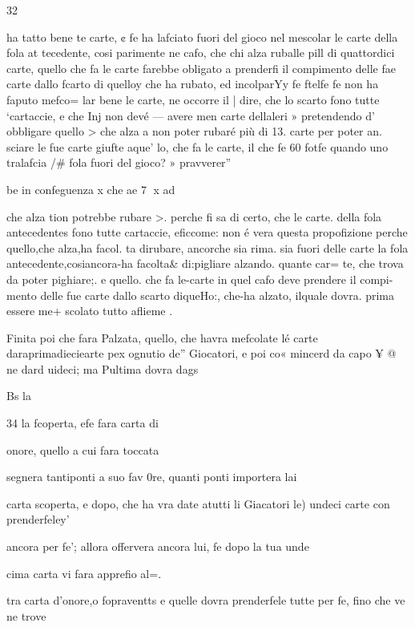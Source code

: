\documentclass[12pt,a6paper]{article}
\begin{document}
 

 

 

 

32

ha tatto bene te carte, ¢ fe ha
lafciato fuori del gioco nel mescolar le carte della fola at
tecedente, cosi parimente ne
cafo, che chi alza ruballe pill di
quattordici carte, quello che fa
le carte farebbe obligato a
prenderfi il compimento delle
fae carte dallo fcarto di quelloy che ha rubato, ed incolparYy
fe ftelfe fe non ha faputo mefco=
lar bene le carte, ne occorre il |
dire, che lo scarto fono tutte
‘cartaccie, e che Inj non devé —
avere men carte dellaleri » pretendendo d’ obbligare quello >
che alza a non poter rubaré
più di 13. carte per poter an.
sciare le fue carte giufte aque’
lo, che fa le carte, il che fe 60%
fotfe quando uno tralafcia /#
fola fuori del gioco? » pravverer”

be in confeguenza x che ae 7
x ad

che alza tion potrebbe rubare >.
perche fi sa di certo, che le
carte. della fola antecedentes
fono tutte cartaccie, eficcome:
non é vera questa propofizione
perche quello,che alza,ha facol.
ta dirubare, ancorche sia rima.
sia fuori delle carte la fola antecedente,cosiancora-ha facolta&
di:pigliare alzando. quante car=
te, che trova da poter pighiare;.
e quello. che fa le-carte in quel
cafo deve prendere il compi-mento delle fue carte dallo scarto diqueHo:, che-ha alzato, ilquale dovra. prima essere me+
scolato tutto aflieme .

Finita poi che fara Palzata,
quello, che havra mefcolate lé
carte daraprimadieciearte pex
ognutio de” Giocatori, e poi co«
mincerd da capo ¥ @ ne dard
uideci; ma Pultima dovra dags

Bs la

 
 

34
la fcoperta, efe fara carta di

onore, quello a cui fara toccata

segnera tantiponti a suo fav 0re, quanti ponti importera lai

carta scoperta, e dopo, che ha
vra date atutti li Giacatori le)
undeci carte con prenderfeley’

ancora per fe’; allora offervera
ancora lui, fe dopo la tua unde

cima carta vi fara apprefio al=.

tra carta d’onore,o fopraventts
e quelle dovra prenderfele tutte per fe, fino che ve ne trove
\end{document}
